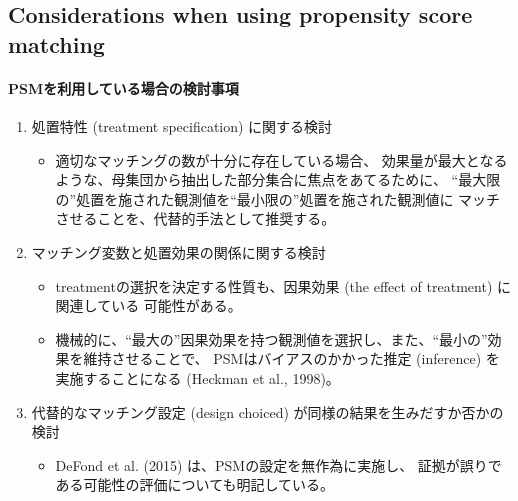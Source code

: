 \subsection{Considerations when using propensity score matching}
\paragraph{PSMを利用している場合の検討事項}
\begin{enumerate}
 \item 処置特性 (treatment specification) に関する検討
       \begin{itemize}
        \item 適切なマッチングの数が十分に存在している場合、
              効果量が最大となるような、母集団から抽出した部分集合に焦点をあてるために、
              ``最大限の''処置を施された観測値を``最小限の''処置を施された観測値に
              マッチさせることを、代替的手法として推奨する。
       \end{itemize}
 \item マッチング変数と処置効果の関係に関する検討
       \begin{itemize}
        \item treatmentの選択を決定する性質も、因果効果 (the effect of treatment) に関連している
              可能性がある。
        \item 機械的に、``最大の''因果効果を持つ観測値を選択し、また、``最小の''効果を維持させることで、
              PSMはバイアスのかかった推定 (inference) を実施することになる (Heckman et al., 1998)。
       \end{itemize}
 \item 代替的なマッチング設定 (design choiced) が同様の結果を生みだすか否かの検討
       \begin{itemize}
        \item DeFond et al. (2015) は、PSMの設定を無作為に実施し、
              証拠が誤りである可能性の評価についても明記している。
       \end{itemize}
\end{enumerate}

